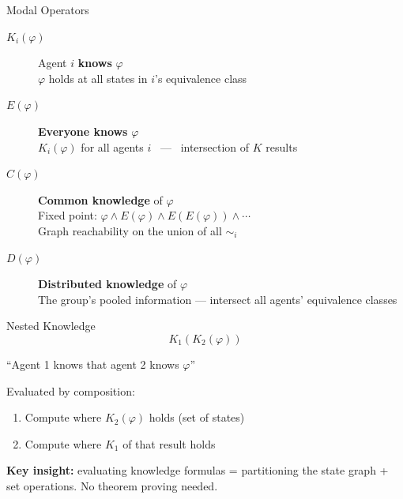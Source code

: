 \documentclass[aspectratio=169,12pt]{beamer}
\begin{document}
\begin{frame}{Modal Operators}
\begin{description}
\item[$K_i(\varphi)$] Agent $i$ \textbf{knows} $\varphi$\\
{\small $\varphi$ holds at all states in $i$'s equivalence class}
\vspace{0.3em}
\item[$E(\varphi)$] \textbf{Everyone knows} $\varphi$\\
{\small $K_i(\varphi)$ for all agents $i$ \ --- \ intersection of $K$ results}
\vspace{0.3em}
\item[$C(\varphi)$] \textbf{Common knowledge} of $\varphi$\\
{\small Fixed point: $\varphi \wedge E(\varphi) \wedge E(E(\varphi)) \wedge \cdots$\\
Graph reachability on the union of all $\sim_i$}
\vspace{0.3em}
\item[$D(\varphi)$] \textbf{Distributed knowledge} of $\varphi$\\
{\small The group's pooled information --- intersect all agents' equivalence classes}
\end{description}
\end{frame}

\begin{frame}{Nested Knowledge}
\Large
$$K_1(K_2(\varphi))$$

\normalsize
``Agent 1 knows that agent 2 knows $\varphi$''

\vspace{1em}
Evaluated by composition:
\begin{enumerate}
\item Compute where $K_2(\varphi)$ holds (set of states)
\item Compute where $K_1$ of that result holds
\end{enumerate}

\vspace{1em}
\textbf{Key insight:} evaluating knowledge formulas = partitioning the state graph + set operations. No theorem proving needed.
\end{frame}
\end{document}

